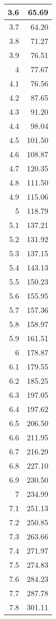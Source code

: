 \documentclass{article}
\begin{document}
\begin{center}
\begin{longtable}{|r|r|}
3.6 &65.69 \\ \hline
3.7 &64.20 \\ \hline
3.8 &71.27 \\ \hline
3.9 &76.51 \\ \hline
4 &77.67 \\ \hline
4.1 &76.56 \\ \hline
4.2 &87.65 \\ \hline
4.3 &91.20 \\ \hline
4.4 &98.04 \\ \hline
4.5 &101.50 \\ \hline
4.6 &108.87 \\ \hline
4.7 &120.35 \\ \hline
4.8 &111.50 \\ \hline
4.9 &115.06 \\ \hline
5 &118.79 \\ \hline
5.1 &137.21 \\ \hline
5.2 &131.92 \\ \hline
5.3 &137.15 \\ \hline
5.4 &143.13 \\ \hline
5.5 &150.23 \\ \hline
5.6 &155.95 \\ \hline
5.7 &157.36 \\ \hline
5.8 &158.97 \\ \hline
5.9 &161.51 \\ \hline
6 &178.87 \\ \hline
6.1 &179.55 \\ \hline
6.2 &185.25 \\ \hline
6.3 &197.05 \\ \hline
6.4 &197.62 \\ \hline
6.5 &206.50 \\ \hline
6.6 &211.95 \\ \hline
6.7 &216.29 \\ \hline
6.8 &227.10 \\ \hline
6.9 &230.50 \\ \hline
7 &234.99 \\ \hline
7.1 &251.13 \\ \hline
7.2 &250.85 \\ \hline
7.3 &263.66 \\ \hline
7.4 &271.97 \\ \hline
7.5 &274.83 \\ \hline
7.6 &284.23 \\ \hline
7.7 &287.78 \\ \hline
7.8 &301.11 \\ \hline

\end{longtable}
\end{center}
\end{document}
